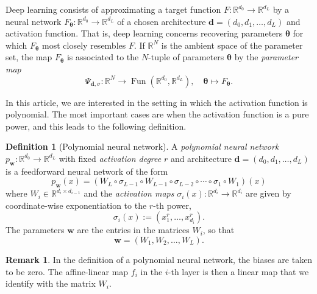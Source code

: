 \documentclass[12pt]{article}
\theoremstyle{definition}
\newtheorem{definition}[theorem]{Definition}
\newtheorem{remark}[theorem]{Remark}
\DeclareMathOperator{\Fun}{Fun}
\newcommand{\btheta}{{\boldsymbol{\theta}}}
\newcommand{\bw}{\mathbf{w}}
\newcommand{\demph}[1]{\emph{{\color{RoyalBlue}#1}}}
\begin{document}
Deep learning consists of approximating a target function $F:\mathbb{R}^{d_0}\to\mathbb{R}^{d_L}$ by a neural network $F_\btheta:\mathbb{R}^{d_0}\to\mathbb{R}^{d_L}$ of a chosen architecture $\mathbf{d} = (d_0,d_1,\dotsc,d_L)$ and activation function. That is, deep learning concerns recovering parameters $\btheta$ for which $F_\btheta$ most closely resembles $F$. 
If $\mathbb{R}^N$ is the ambient space of the parameter set, the map $F_\btheta$ is associated to the $N$-tuple of parameters $\btheta$ by the \demph{parameter map}
\begin{equation}\label{eq:parameter-map}
    \Psi_{\mathbf{d},\sigma}:\mathbb{R}^{N}\to\Fun(\mathbb{R}^{d_0},\mathbb{R}^{d_L}),\quad \btheta\mapsto F_\btheta.
\end{equation}

In this article, we are interested in the setting in which the activation function is polynomial. The most important cases are when the activation function is a pure power, and this leads to the following definition. 

\begin{definition}[Polynomial neural network]\label{def:pnn}
    A \demph{polynomial neural network} $p_\textbf{w}:\mathbb{R}^{d_0}\to\mathbb{R}^{d_L}$ with fixed \demph{activation degree} $r$ and architecture $\mathbf{d}=(d_0,d_1,\dots,d_L)$ is a feedforward neural network of the form
    \begin{equation}\label{eq:pnn-function}
        p_\bw(x)=(W_L\circ\sigma_{L-1}\circ W_{L-1}\circ\sigma_{L-2}\circ\cdots\circ\sigma_1\circ W_1)(x)
    \end{equation}
    where $W_i\in\mathbb{R}^{d_i\times d_{i-1}}$ and the \demph{activation maps} $\sigma_i(x):\mathbb{R}^{d_i}\to\mathbb{R}^{d_i}$ are given by coordinate-wise exponentiation to the $r$-th power,
    \begin{equation*}
        \sigma_i(x):=(x_1^r,\dots,x_{d_i}^r).
    \end{equation*} The parameters $\bw$ are the entries in the matrices $W_i$, so that 
    \[
    \bw=(W_1,W_2,\dots,W_L).
    \]
\end{definition}


\begin{remark}
    In the definition of a polynomial neural network, the biases are taken to be zero. The affine-linear map $f_i$ in the $i$-th layer is then a linear map that we identify with the matrix $W_i$.
\end{remark}
\end{document}
